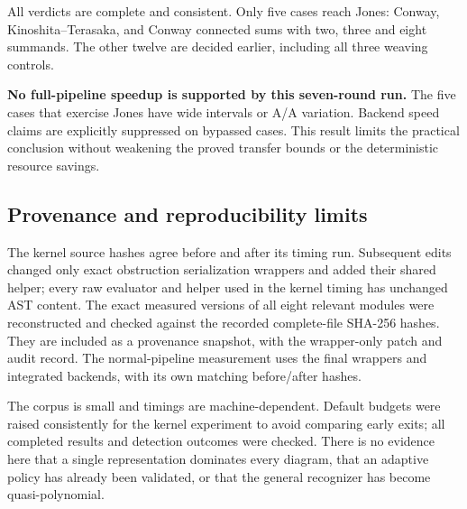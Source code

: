 All verdicts are complete and consistent. Only five cases reach Jones:
Conway, Kinoshita--Terasaka, and Conway connected sums with two, three
and eight summands. The other twelve are decided earlier, including all
three weaving controls.



\textbf{No full-pipeline speedup is supported by this seven-round run.}
The five cases that exercise Jones have wide intervals or A/A variation.
Backend speed claims are explicitly suppressed on bypassed cases.
This result limits the practical conclusion without weakening the proved
transfer bounds or the deterministic resource savings.

\subsection{Provenance and reproducibility limits}

The kernel source hashes agree before and after its timing run.
Subsequent edits changed only exact obstruction serialization wrappers and
added their shared helper; every raw evaluator and helper used in the
kernel timing has unchanged AST content. The exact measured versions of
all eight relevant modules were reconstructed and checked against the
recorded complete-file SHA-256 hashes. They are included as a provenance
snapshot, with the wrapper-only patch and audit record.
The normal-pipeline measurement uses the final wrappers and integrated
backends, with its own matching before/after hashes.

The corpus is small and timings are machine-dependent. Default budgets
were raised consistently for the kernel experiment to avoid comparing
early exits; all completed results and detection outcomes were checked.
There is no evidence here that a single representation dominates every
diagram, that an adaptive policy has already been validated, or that the
general recognizer has become quasi-polynomial.
